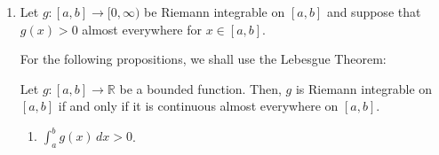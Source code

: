 \begin{enumerate}
\begin{enumerate}
\begin{proof}
                    Define the sequence of open intervals $X := \{I_j\}_{j \ge 1} \cup \{J_j\}_{j \ge 1}$, and let $X_j = (p_j, q_j)$ denote the $j$-th element of $X$.
                    Then,
                    \begin{align*}
                        A_1 \cup A_2 &\subseteq \left[\bigcup_{j = 0}^\infty I_j\right] \cup \left[\bigcup_{j = 0}^\infty J_j\right], \\
                        &= \bigcup_{j = 0}^\infty X_j.
                    \end{align*}
                    We also have
                    \begin{align*}
                        \sum_{j = 1}^\infty (q_j - p_j) &= \sum_{j = 1}^\infty (b_j - a_j) + \sum_{j = 1}^\infty (d_j - c_j), \\
                        &< \epsilon_1 + \epsilon_2, \\
                        &< \epsilon.
                    \end{align*}

                    Thus, the sequence $X$ satisfies the criteria in \cref{def:measure-zero} for any $\epsilon$, hence if $A_1$ and $A_2$ each have measure zero, then $A_1 \cup A_2$ has measure zero.
                \end{proof}

                \bigskip

            \item Let $g: [a, b] \to [0, \infty)$ be Riemann integrable on $[a, b]$ and suppose that $g(x) > 0$ almost everywhere for $x \in [a, b]$.

                For the following propositions, we shall use the Lebesgue Theorem:

                \medskip

                \begin{theorem} \label{thm:lebesgue}
                    Let $g: [a, b] \to \mathbb{R}$ be a bounded function.
                    Then, $g$ is Riemann integrable on $[a, b]$ if and only if it is continuous almost everywhere on $[a, b]$.
                \end{theorem}

                \bigskip

                \begin{enumerate}

                    \item
                        \begin{proposition} \label{prop:1ci}
                            $\int_a^b g(x) \, dx > 0$.
                        \end{proposition}


\end{enumerate}
\end{enumerate}
\end{enumerate}

